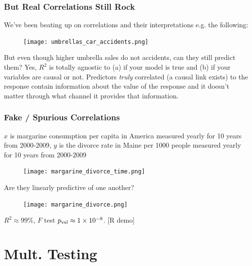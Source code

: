 \documentclass[handout]{beamer}
\begin{document}
\begin{frame}\frametitle{But Real Correlations Still Rock}

We've been beating up on correlations and their interpretations e.g. the following:

\begin{figure}
\centering
\texttt{[image: umbrellas\_car\_accidents.png]}
\end{figure}
\pause

But even though higher umbrella sales do not  accidents, can they still predict them? \pause Yes, $R^2$ is totally agnostic to (a) if your model is true and \pause (b) if your variables are causal or not. Predictors \textit{truly} correlated (a causal link exists) to the response contain information about the value of the response and it doesn't matter through what channel it provides that information. \pause
	
\end{frame}

\begin{frame}\frametitle{Fake / Spurious Correlations}
\pause 

\footnotesize
$x$ is margarine consumption per capita in America measured yearly for 10 years from 2000-2009, $y$ is the divorce rate in Maine per 1000 people measured yearly for 10 years from 2000-2009

\vspace{-0.2cm}
\begin{figure}
\centering
\texttt{[image: margarine\_divorce\_time.png]}
\end{figure}

\vspace{-0.3cm}
Are they linearly predictive of one another? \pause

\vspace{-0.2cm}
\begin{figure}
\centering
\texttt{[image: margarine\_divorce.png]}
\end{figure}
\pause


\vspace{-0.3cm}
$R^2 \approx 99\%$, $F$ test $p_{\text{val}} \approx 1 \times 10^{-8}$. [R demo] 

	
\end{frame}

\section{Mult. Testing}
\end{document}
